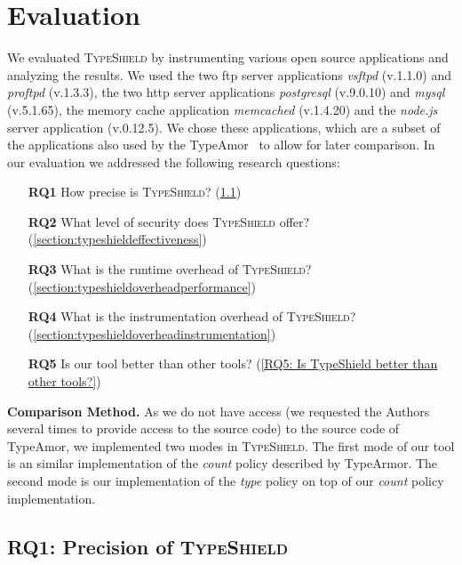\section{Evaluation}
\label{chapter:Evaluation}
We evaluated \textsc{TypeShield} by instrumenting various open source applications and analyzing the results. 
We used the two ftp server applications \textit{vsftpd} (v.1.1.0) and \textit{proftpd} (v.1.3.3), the two http server 
applications \textit{postgresql} (v.9.0.10) and \textit{mysql} (v.5.1.65), the memory cache application \textit{memcached} (v.1.4.20) 
and the \textit{node.js} server application (v.0.12.5). We chose these applications, which are a subset of the 
applications also used by the TypeAmor~\cite{veen:typearmor} to allow for later comparison.
In our evaluation we addressed the following research questions:
\begin{itemize}
 \item[\textbf{RQ1}] How precise is \textsc{TypeShield}? (\cref{section:typeshieldprecision})
 \item[\textbf{RQ2}] What level of security does \textsc{TypeShield} offer? (\cref{section:typeshieldeffectiveness})
 \item[\textbf{RQ3}] What is the runtime overhead of \textsc{TypeShield}? (\cref{section:typeshieldoverheadperformance})
 \item[\textbf{RQ4}] What is the instrumentation overhead of \textsc{TypeShield}? (\cref{section:typeshieldoverheadinstrumentation})
 \item[\textbf{RQ5}] Is our tool better than other tools? (\cref{RQ5: Is TypeShield better than other tools?})
\end{itemize}
\textbf{Comparison Method.} As we do not have access (we requested the Authors several times to provide access to the source code) to the source code of TypeAmor, we implemented two modes in \textsc{TypeShield}. 
The first mode of our tool is an similar implementation of the \textit{count} 
policy described by TypeArmor. The second mode is our implementation of the \textit{type} policy on
top of our \textit{count} policy implementation. 
%

\subsection{RQ1: Precision of \textsc{TypeShield}}
\label{section:typeshieldprecision}

